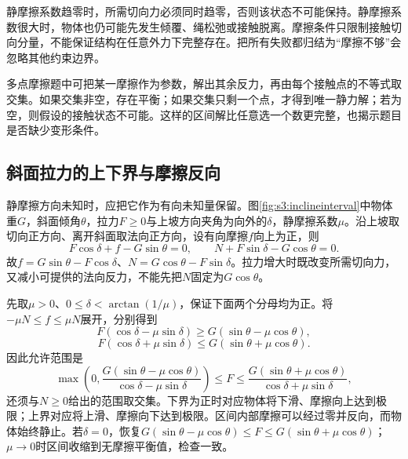 静摩擦系数趋零时，所需切向力必须同时趋零，否则该状态不可能保持。静摩擦系数很大时，物体也仍可能先发生倾覆、绳松弛或接触脱离。摩擦条件只限制接触切向分量，不能保证结构在任意外力下完整存在。把所有失败都归结为“摩擦不够”会忽略其他约束边界。

多点摩擦题中可把某一摩擦作为参数，解出其余反力，再由每个接触点的不等式取交集。如果交集非空，存在平衡；如果交集只剩一个点，才得到唯一静力解；若为空，则假设的接触状态不可能。这样的区间解比任意选一个数更完整，也揭示题目是否缺少变形条件。



\subsection{斜面拉力的上下界与摩擦反向}
静摩擦方向未知时，应把它作为有向未知量保留。图\ref{fig:s3:inclineinterval}中物体重$G$，斜面倾角$\theta$，拉力$F\ge0$与上坡方向夹角为向外的$\delta$，静摩擦系数$\mu$。沿上坡取切向正方向、离开斜面取法向正方向，设有向摩擦$f$向上为正，则
\[
F\cos\delta+f-G\sin\theta=0,\qquad
N+F\sin\delta-G\cos\theta=0.
\]
故$f=G\sin\theta-F\cos\delta$、$N=G\cos\theta-F\sin\delta$。拉力增大时既改变所需切向力，又减小可提供的法向反力，不能先把$N$固定为$G\cos\theta$。

先取$\mu>0$、$0\le\delta<\arctan(1/\mu)$，保证下面两个分母均为正。将$-\mu N\le f\le\mu N$展开，分别得到
\[
F(\cos\delta-\mu\sin\delta)\ge G(\sin\theta-\mu\cos\theta),
\]
\[
F(\cos\delta+\mu\sin\delta)\le G(\sin\theta+\mu\cos\theta).
\]
因此允许范围是
\[
\max\!\left(0,\frac{G(\sin\theta-\mu\cos\theta)}{\cos\delta-\mu\sin\delta}\right)
\le F\le
\frac{G(\sin\theta+\mu\cos\theta)}{\cos\delta+\mu\sin\delta},
\]
还须与$N\ge0$给出的范围取交集。下界为正时对应物体将下滑、摩擦向上达到极限；上界对应将上滑、摩擦向下达到极限。区间内部摩擦可以经过零并反向，而物体始终静止。若$\delta=0$，恢复$G(\sin\theta-\mu\cos\theta)\le F\le G(\sin\theta+\mu\cos\theta)$；$\mu\to0$时区间收缩到无摩擦平衡值，检查一致。

